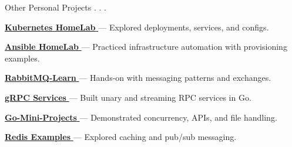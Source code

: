\begin{cventries}
  \cventry
    {Other Personal Projects}
    {.}
    {.}
    {.}
    {
      \begin{cvitems}
        \item {\href{https://github.com/nmdra/K8s-Learn}{\textbf{Kubernetes HomeLab} \faGithub} — Explored deployments, services, and configs.}
        \item {\href{https://github.com/nmdra/Ansible-Learn}{\textbf{Ansible HomeLab} \faGithub} — Practiced infrastructure automation with provisioning examples.}
        \item {\href{https://github.com/nmdra/RabbitMQ-Learn}{\textbf{RabbitMQ-Learn} \faGithub} — Hands-on with messaging patterns and exchanges.}
        \item {\href{https://github.com/nmdra/gRPC-Learn}{\textbf{gRPC Services} \faGithub} — Built unary and streaming RPC services in Go.}
        \item {\href{https://github.com/nmdra/Go-Mini-Projects}{\textbf{Go-Mini-Projects} \faGithub} — Demonstrated concurrency, APIs, and file handling.}
        \item {\href{https://github.com/nmdra/Redis-Learn}{\textbf{Redis Examples} \faGithub} — Explored caching and pub/sub messaging.}
      \end{cvitems}
    }

\end{cventries}
